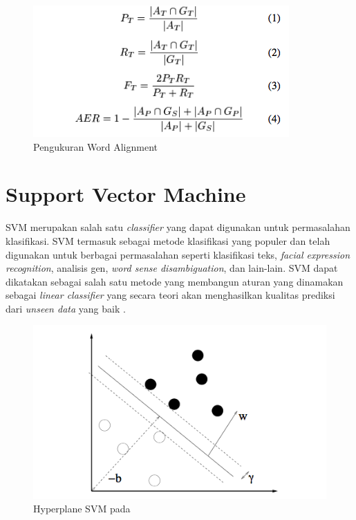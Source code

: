 \begin{figure}
	\centering
	\includegraphics[width=1\linewidth]{adit_pics/Pengukuran-Word-Alignment}
	\caption{Pengukuran Word Alignment}
	\label{fig:Pengukuran-Word-Alignment}
\end{figure}

\section{Support Vector Machine}
SVM merupakan salah satu \textit{classifier} yang dapat digunakan untuk permasalahan klasifikasi. SVM termasuk sebagai metode klasifikasi yang populer dan telah digunakan untuk berbagai permasalahan seperti klasifikasi teks, \textit{facial expression recognition}, analisis gen, \textit{word sense disambiguation}, dan lain-lain. SVM dapat dikatakan sebagai salah satu metode yang membangun aturan yang dinamakan sebagai \textit{linear classifier} yang secara teori akan menghasilkan kualitas prediksi dari \textit{unseen data} yang baik \citep{fradkin2006support}.

\begin{figure}
	\centering
	\includegraphics[width=1\linewidth]{adit_pics/svm-hyperplane}
	\caption{Hyperplane SVM pada \citep{fradkin2006support}}
	\label{fig:svm}
\end{figure}

